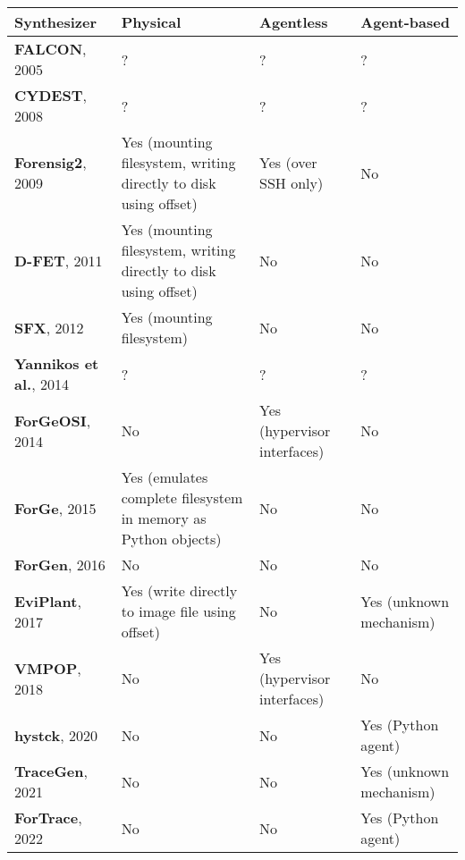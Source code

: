 \documentclass[letterpaper,12pt]{report}
\begin{document}
\begin{longtable}[]{@{}
  >{\raggedright\arraybackslash}p{}
  >{\raggedright\arraybackslash}p{}
  >{\raggedright\arraybackslash}p{}
  >{\raggedright\arraybackslash}p{}@{}}
\toprule\noalign{}
\begin{minipage}[b]{\linewidth}\raggedright
Synthesizer
\end{minipage} & \begin{minipage}[b]{\linewidth}\raggedright
Physical
\end{minipage} & \begin{minipage}[b]{\linewidth}\raggedright
Agentless
\end{minipage} & \begin{minipage}[b]{\linewidth}\raggedright
Agent-based
\end{minipage} \\
\midrule\noalign{}
\endhead
\bottomrule\noalign{}
\endlastfoot
\textbf{FALCON}, 2005 & ? & ? & ? \\
\textbf{CYDEST}, 2008 & ? & ? & ? \\
\textbf{Forensig2}, 2009 & Yes (mounting filesystem, writing directly to
disk using offset) & Yes (over SSH only) & No \\
\textbf{D-FET}, 2011 & Yes (mounting filesystem, writing directly to
disk using offset) & No & No \\
\textbf{SFX}, 2012 & Yes (mounting filesystem) & No & No \\
\textbf{Yannikos et al.}, 2014 & ? & ? & ? \\
\textbf{ForGeOSI}, 2014 & No & Yes (hypervisor interfaces) & No \\
\textbf{ForGe}, 2015 & Yes (emulates complete filesystem in memory as
Python objects) & No & No \\
\textbf{ForGen}, 2016 & No & No & No \\
\textbf{EviPlant}, 2017 & Yes (write directly to image file using
offset) & No & Yes (unknown mechanism) \\
\textbf{VMPOP}, 2018 & No & Yes (hypervisor interfaces) & No \\
\textbf{hystck}, 2020 & No & No & Yes (Python agent) \\
\textbf{TraceGen}, 2021 & No & No & Yes (unknown mechanism) \\
\textbf{ForTrace}, 2022 & No & No & Yes (Python agent) \\
\end{longtable}
\end{document}
